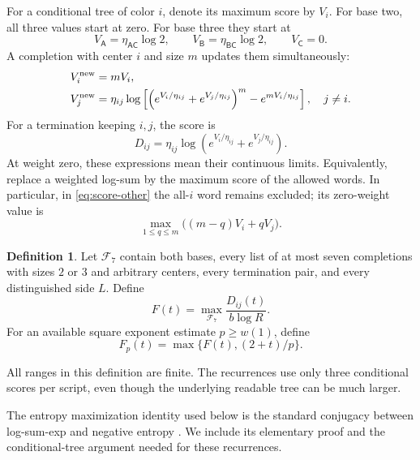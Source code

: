 \documentclass[11pt]{article}
\numberwithin{equation}{section}
\theoremstyle{definition}
\newtheorem{definition}[theorem]{Definition}
\theoremstyle{remark}
\begin{document}
For a conditional tree of color \(i\), denote its maximum score by
\(V_i\).
For base two, all three values start at zero.
For base three they start at
\begin{equation}\label{eq:initial-scores}
 V_{\mathsf A}=\eta_{\mathsf A\mathsf C}\log2,\qquad
 V_{\mathsf B}=\eta_{\mathsf B\mathsf C}\log2,\qquad
 V_{\mathsf C}=0.
\end{equation}
A completion with center \(i\) and size \(m\) updates them simultaneously:
\begin{align}
 V_i^{\rm new}&=mV_i, \label{eq:score-center}\\
 V_j^{\rm new}
 &=\eta_{ij}\log\left[
   \left(e^{V_i/\eta_{ij}}+e^{V_j/\eta_{ij}}\right)^m
       -e^{mV_i/\eta_{ij}}\right],\quad j\ne i. \label{eq:score-other}
\end{align}
For a termination keeping \(i,j\), the score is
\begin{equation}\label{eq:termination-score}
 D_{ij}=\eta_{ij}\log
       \left(e^{V_i/\eta_{ij}}+e^{V_j/\eta_{ij}}\right).
\end{equation}
At weight zero, these expressions mean their continuous limits.
Equivalently, replace a weighted log-sum by the maximum score of the
allowed words.
In particular, in \eqref{eq:score-other} the all-\(i\) word remains
excluded; its zero-weight value is
\[
 \max_{1\le q\le m}\bigl((m-q)V_i+qV_j\bigr).
\]

\begin{definition}\label{def:support-function}
Let \(\mathcal F_7\) contain both bases, every list of at most seven
completions with sizes \(2\) or \(3\) and arbitrary centers, every
termination pair, and every distinguished side \(L\).
Define
\begin{equation}\label{eq:F-definition}
 F(t)=\max_{\mathcal F_7}\frac{D_{ij}(t)}{b\log R}.
\end{equation}
For an available square exponent estimate \(p\ge w(1)\), define
\[
 F_p(t)=\max\{F(t),(2+t)/p\}.
\]
\end{definition}

All ranges in this definition are finite.
The recurrences use only three conditional scores per script, even
though the underlying readable tree can be much larger.

The entropy maximization identity used below is the standard conjugacy
between log-sum-exp and negative entropy
\cite[Example~3.25]{boyd-vandenberghe}.  We include its elementary
proof and the conditional-tree argument needed for these recurrences.
\end{document}
